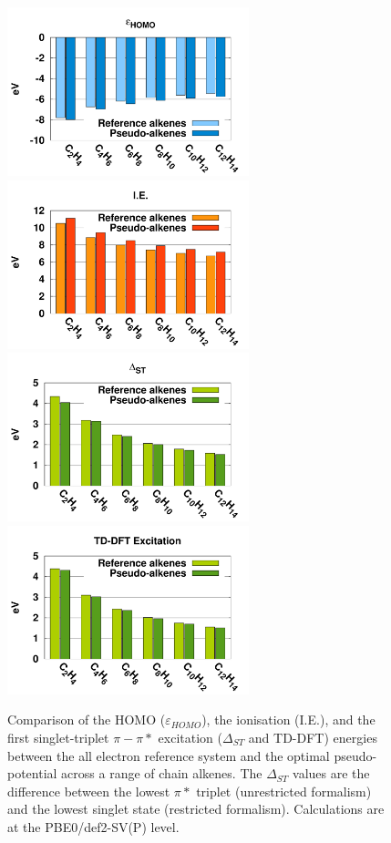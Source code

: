 \documentclass[aip]{revtex4-1}
\begin{document}
\begin{figure}
\begin{center}
\includegraphics[width=7cm]{short_pbe0_homo}
\includegraphics[width=7cm]{short_pbe0_ie}
\includegraphics[width=7cm]{short_pbe0_st}
\includegraphics[width=7cm]{short_pbe0_tddft}
\end{center}
\caption{Comparison of the HOMO ($\varepsilon_{HOMO}$),
the ionisation (I.E.), and
the first singlet-triplet $\pi-\pi*$ excitation ($\Delta_{ST}$ and TD-DFT) energies
between the
all electron reference system and the optimal pseudo-potential across a range of chain alkenes.
The $\Delta_{ST}$ values are the difference
between the lowest $\pi*$ triplet (unrestricted formalism) and the lowest singlet state
(restricted formalism).
Calculations are at the PBE0/def2-SV(P) level.}
\label{fig:alkenes_hf_dft}
\end{figure}
\end{document}
